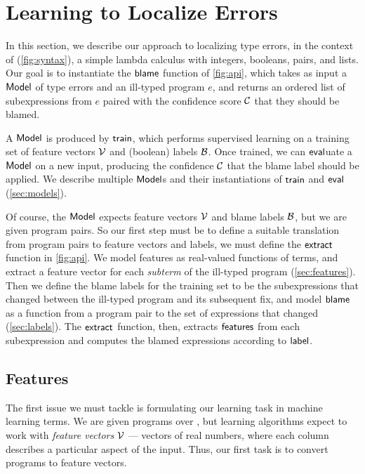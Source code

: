 
\section{Learning to Localize Errors}
\label{sec:localization}
In this section, we describe our approach to localizing type errors, in the context of \lang (\autoref{fig:syntax}), a
simple lambda calculus with integers, booleans, pairs, and lists.
%
Our goal is to instantiate the $\mathsf{blame}$ function of \autoref{fig:api}, which takes as input a $\mathsf{Model}$ of type errors
and an ill-typed program $e$, and returns an ordered list of subexpressions from $e$ paired with the confidence score
$\mathcal{C}$ that they should be blamed.

A $\mathsf{Model}$ is produced by $\mathsf{train}$, which performs supervised learning on a training set of feature vectors $\mathcal{V}$ and
(boolean) labels $\mathcal{B}$.
%
Once trained, we can $\mathsf{eval}$uate a $\mathsf{Model}$ on a new input, producing the confidence $\mathcal{C}$ that the blame label
should be applied.
%
We describe multiple $\mathsf{Model}$s and their instantiations of $\mathsf{train}$ and $\mathsf{eval}$ (\autoref{sec:models}).

Of course, the $\mathsf{Model}$ expects feature vectors $\mathcal{V}$ and blame labels $\mathcal{B}$, but we are given program pairs.
%
So our first step must be to define a suitable translation from program pairs to feature vectors and labels, \ie we must
define the $\mathsf{extract}$ function in \autoref{fig:api}.
%
We model features as real-valued functions of terms, and extract a feature vector for each \emph{subterm} of the
ill-typed program (\autoref{sec:features}).
%
Then we define the blame labels for the training set to be the subexpressions that changed between the ill-typed program
and its subsequent fix, and model $\mathsf{blame}$ as a function from a program pair to the set of expressions that changed
(\autoref{sec:labels}).
%
The $\mathsf{extract}$ function, then, extracts $\mathsf{features}$ from each subexpression and computes the blamed expressions
according to $\mathsf{label}$.




\subsection{Features}
\label{sec:features}
The first issue we must tackle is formulating our learning task in machine learning terms.
%
We are given programs over \lang, but learning algorithms expect to work with \emph{feature vectors} $\mathcal{V}$ --- vectors of
real numbers, where each column describes a particular aspect of the input.
%
Thus, our first task is to convert programs to feature vectors.

